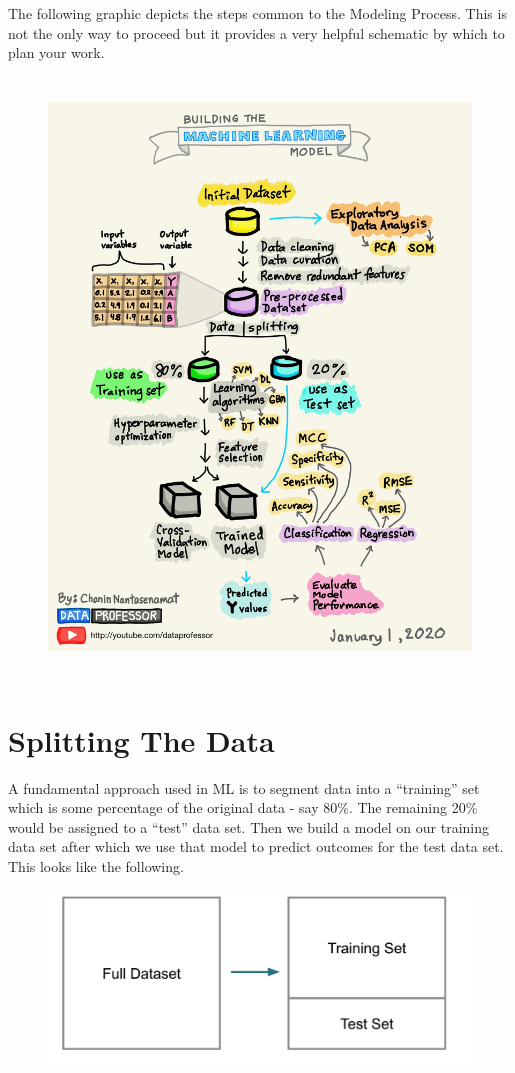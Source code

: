 \documentclass[]{book}
\begin{document}
The following graphic depicts the steps common to the Modeling Process.
This is not the only way to proceed but it provides a very helpful
schematic by which to plan your work.

\begin{figure}
\centering
\includegraphics[height=6.25000in]{./PICS/sworkflow.jpg}
\caption{}
\end{figure}

\chapter{Splitting The Data}\label{splitting-the-data}

A fundamental approach used in ML is to segment data into a ``training''
set which is some percentage of the original data - say 80\%. The
remaining 20\% would be assigned to a ``test'' data set. Then we build a
model on our training data set after which we use that model to predict
outcomes for the test data set. This looks like the following.

\begin{figure}
\centering
\includegraphics[width=5.20833in]{./PICS/crossvalid.png}
\caption{}
\end{figure}
\end{document}
